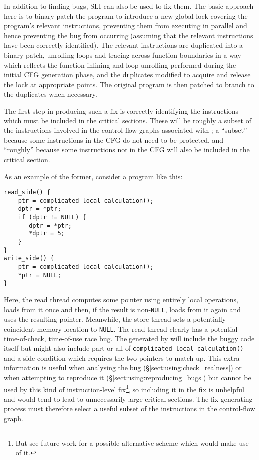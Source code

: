 In addition to finding bugs, SLI can also be used to fix them.  The
basic approach here is to binary patch the program to introduce a new
global lock covering the program's relevant instructions, preventing
them from executing in parallel and hence preventing the bug from
occurring (assuming that the relevant instructions have been correctly
identified).  The relevant instructions are duplicated into a binary
patch, unrolling loops and tracing across function boundaries in a way
which reflects the function inlining and loop unrolling performed
during the initial CFG generation phase, and the duplicates modified
to acquire and release the lock at appropriate points.  The original
program is then patched to branch to the duplicates when necessary.

The first step in producing such a fix is correctly identifying the
instructions which must be included in the critical sections.  These
will be roughly a subset of the instructions involved in the
control-flow graphs associated with \StateMachines; a ``subset''
because some instructions in the CFG do not need to be protected, and
``roughly'' because some instructions not in the CFG will also be
included in the critical section.


As an example of the former, consider a program like this:

\begin{verbatim}
read_side() {
    ptr = complicated_local_calculation();
    dptr = *ptr;
    if (dptr != NULL) {
       dptr = *ptr;
       *dptr = 5;
    }
}
write_side() {
    ptr = complicated_local_calculation();
    *ptr = NULL;
}
\end{verbatim}

Here, the read thread computes some pointer using entirely local
operations, loads from it once and then, if the result is
non-\verb|NULL|, loads from it again and uses the resulting pointer.
Meanwhile, the store thread sets a potentially coincident memory
location to \verb|NULL|.  The read thread clearly has a potential
time-of-check, time-of-use race bug.  The {\StateMachines} generated
by {\technique} will include the buggy code itself but might also
include part or all of \verb|complicated_local_calculation()| and a
side-condition which requires the two pointers to match up.  This
extra information is useful when analysing the bug
(\S\ref{sect:using:check_realness}) or when attempting to reproduce it
(\S\ref{sect:using:reproducing_bugs}) but cannot be used by this kind
of instruction-level fix\footnote{But see future work for a possible
  alternative scheme which would make use of it.}, so including it in
the fix is unhelpful and would tend to lead to unnecessarily large
critical sections.  The fix generating process must therefore select a
useful subset of the instructions in the control-flow graph.

